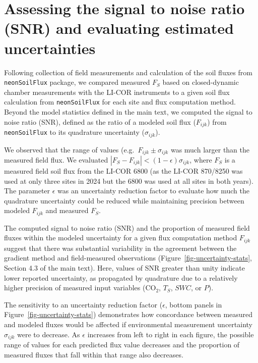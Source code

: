 \documentclass[
  letterpaper,
  DIV=11,
  numbers=noendperiod]{scrartcl}
\begin{document}
\section{Assessing the signal to noise ratio (SNR) and evaluating
estimated
uncertainties}\label{assessing-the-signal-to-noise-ratio-snr-and-evaluating-estimated-uncertainties}

Following collection of field measurements and calculation of the soil
fluxes from \texttt{neonSoilFlux} package, we compared measured
\(F_{S}\) based on closed-dynamic chamber measurements with the LI-COR
instruments to a given soil flux calculation from \texttt{neonSoilFlux}
for each site and flux computation method. Beyond the model statistics
defined in the main text, we computed the signal to noise ratio (SNR),
defined as the ratio of a modeled soil flux (\(F_{ijk}\)) from
\texttt{neonSoilFlux} to its quadrature uncertainty (\(\sigma_{ijk}\)).

We observed that the range of values (e.g.~\(F_{ijk} \pm \sigma_{ijk}\)
was much larger than the measured field flux. We evaluated
\(| F_{S} - F_{ijk} | < (1-\epsilon) \sigma_{ijk}\), where \(F_{S}\) is
a measured field soil flux from the LI-COR 6800 (as the LI-COR 870/8250
was used at only three sites in 2024 but the 6800 was used at all sites
in both years). The parameter \(\epsilon\) was an uncertainty reduction
factor to evaluate how much the quadrature uncertainty could be reduced
while maintaining precision between modeled \(F_{ijk}\) and measured
\(F_{S}\).

The computed signal to noise ratio (SNR) and the proportion of measured
field fluxes within the modeled uncertainty for a given flux computation
method \(F_{ijk}\) suggest that there was substantial variability in the
agreement between the gradient method and field-measured observations
(Figure~\ref{fig-uncertainty-stats}, Section 4.3 of the main text).
Here, values of SNR greater than unity indicate lower reported
uncertainty, as propagated by quadrature due to a relatively higher
precision of measured input variables (CO\(_{2}\), \(T_{S}\), \(SWC\),
or \(P\)).

The sensitivity to an uncertainty reduction factor (\(\epsilon\), bottom
panels in Figure~\ref{fig-uncertainty-stats}) demonstrates how
concordance between measured and modeled fluxes would be affected if
environmental measurement uncertainty \(\sigma_{ijk}\) were to decrease.
As \(\epsilon\) increases from left to right in each figure, the
possible range of values for each predicted flux value decreases and the
proportion of measured fluxes that fall within that range also
decreases.
\end{document}
